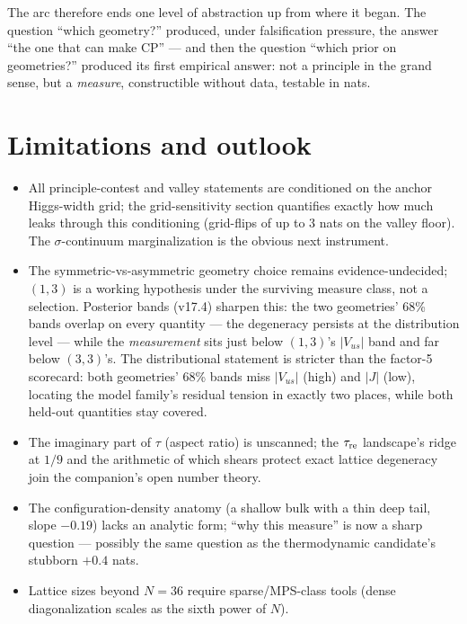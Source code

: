 \documentclass[aps,prd,preprint,nofootinbib]{revtex4-2}
\begin{document}
The arc therefore ends one level of abstraction up from where it began. The
question ``which geometry?'' produced, under falsification pressure, the answer
``the one that can make CP'' --- and then the question ``which prior on
geometries?'' produced its first empirical answer: not a principle in the grand
sense, but a \emph{measure}, constructible without data, testable in nats.

\section{Limitations and outlook}

\begin{itemize}
\item All principle-contest and valley statements are conditioned on the anchor
      Higgs-width grid; the grid-sensitivity section quantifies exactly how
      much leaks through this conditioning (grid-flips of up to 3 nats on the
      valley floor). The $\sigma$-continuum marginalization is the obvious next
      instrument.
\item The symmetric-vs-asymmetric geometry choice remains evidence-undecided;
      $(1,3)$ is a working hypothesis under the surviving measure class, not a
      selection. Posterior bands (v17.4) sharpen this: the two geometries'
      68\% bands overlap on every quantity --- the degeneracy persists at the
      distribution level --- while the \emph{measurement} sits just below
      $(1,3)$'s $|V_{us}|$ band and far below $(3,3)$'s. The distributional
      statement is stricter than the factor-5 scorecard: both geometries' 68\%
      bands miss $|V_{us}|$ (high) and $|J|$ (low), locating the model family's
      residual tension in exactly two places, while both held-out quantities
      stay covered.
\item The imaginary part of $\tau$ (aspect ratio) is unscanned; the
      $\tau_{\rm re}$ landscape's ridge at $1/9$ and the arithmetic of which
      shears protect exact lattice degeneracy join the companion's open number
      theory.
\item The configuration-density anatomy (a shallow bulk with a thin deep tail,
      slope $-0.19$) lacks an analytic form; ``why this measure'' is now a
      sharp question --- possibly the same question as the thermodynamic
      candidate's stubborn $+0.4$ nats.
\item Lattice sizes beyond $N=36$ require sparse/MPS-class tools (dense
      diagonalization scales as the sixth power of $N$).
\end{itemize}
\end{document}
